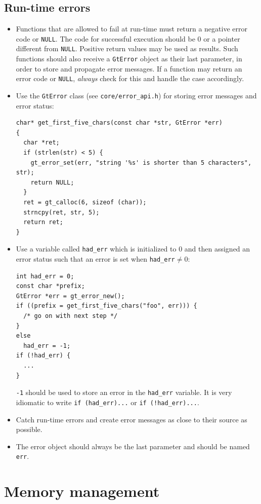 \documentclass[11pt,final]{article}
\newcommand{\keyword}[1]{\lstinline{#1}}
\begin{document}
\subsection{Run-time errors}
\label{errors}
\begin{itemize}
\item
Functions that are allowed to fail at run-time must return a negative error
code or \texttt{NULL}. The code for successful execution should be 0 or a
pointer different from \texttt{NULL}. Positive return values may be used as
results.
Such functions should also receive a \keyword{GtError} object as their last
parameter, in order to store and propagate error messages.
If a function may return an error code or \texttt{NULL}, \emph{always} check for
this and handle the case accordingly.
\item
Use the \keyword{GtError} class (see \keyword{core/error_api.h}) for storing
error messages and error status:
\begin{lstlisting}
char* get_first_five_chars(const char *str, GtError *err)
{
  char *ret;
  if (strlen(str) < 5) {
    gt_error_set(err, "string '%s' is shorter than 5 characters", str);
    return NULL;
  }
  ret = gt_calloc(6, sizeof (char));
  strncpy(ret, str, 5);
  return ret;
}
\end{lstlisting}
\item
Use a variable called \keyword{had_err} which is initialized to 0 and then
assigned an error status such that an error is set when \keyword{had_err}$\neq 0$:
\begin{lstlisting}
int had_err = 0;
const char *prefix;
GtError *err = gt_error_new();
if ((prefix = get_first_five_chars("foo", err))) {
  /* go on with next step */
}
else
  had_err = -1;
if (!had_err) {
  ...
}
\end{lstlisting}
\keyword{-1} should be used to store an error in the \keyword{had_err} variable.
It is very idiomatic to write \keyword{if (had_err)...} or
\keyword{if (!had_err)...}.
\item
Catch run-time errors and create error messages as close to their source as possible.
\item
The error object should always be the last parameter and should be named
\keyword{err}.
\end{itemize}

\section{Memory management}
\end{document}
